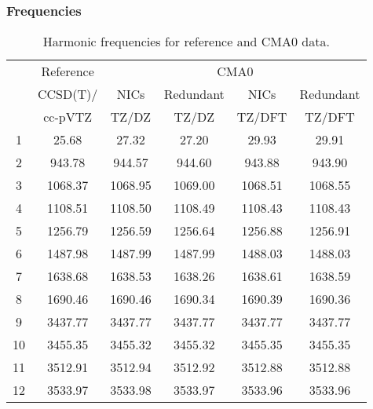 \documentclass[10pt,oneside]{article}
\begin{document}
\begin{table}[h!]
\subsubsection*{Frequencies}
\centering
\caption{Harmonic frequencies for reference and CMA0 data.}
\begin{tabular}{cccccc}
\toprule
{} & Reference & \multicolumn{4}{c}{CMA0} \\
{} &  CCSD(T)/ &    NICs &  Redundant &    NICs & Redundant \\
{} &   cc-pVTZ &   TZ/DZ &      TZ/DZ &  TZ/DFT &    TZ/DFT \\
\midrule
1  &     25.68 &   27.32 &      27.20 &   29.93 &     29.91 \\
2  &    943.78 &  944.57 &     944.60 &  943.88 &    943.90 \\
3  &   1068.37 & 1068.95 &    1069.00 & 1068.51 &   1068.55 \\
4  &   1108.51 & 1108.50 &    1108.49 & 1108.43 &   1108.43 \\
5  &   1256.79 & 1256.59 &    1256.64 & 1256.88 &   1256.91 \\
6  &   1487.98 & 1487.99 &    1487.99 & 1488.03 &   1488.03 \\
7  &   1638.68 & 1638.53 &    1638.26 & 1638.61 &   1638.59 \\
8  &   1690.46 & 1690.46 &    1690.34 & 1690.39 &   1690.36 \\
9  &   3437.77 & 3437.77 &    3437.77 & 3437.77 &   3437.77 \\
10 &   3455.35 & 3455.32 &    3455.32 & 3455.35 &   3455.35 \\
11 &   3512.91 & 3512.94 &    3512.92 & 3512.88 &   3512.88 \\
12 &   3533.97 & 3533.98 &    3533.97 & 3533.96 &   3533.96 \\
\bottomrule
\end{tabular}
\end{table}
\end{document}
